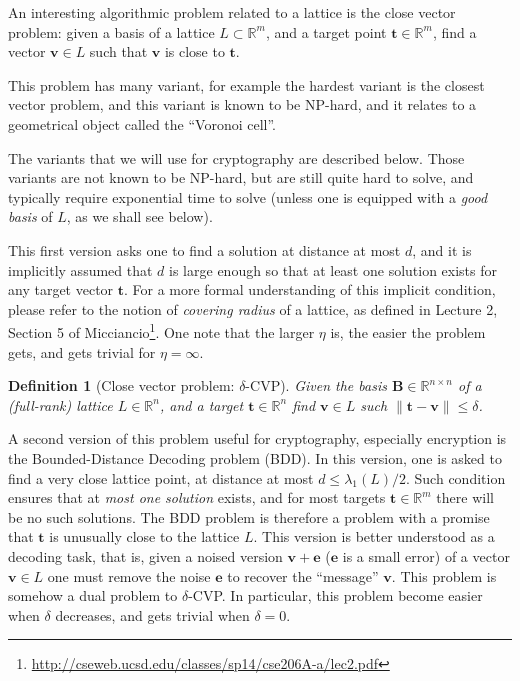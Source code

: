 \documentclass[12pt]{article}
\renewcommand{\vec}{\mathbf}
\newcommand{\R}{\mathbb R}
\newtheorem{definition}{Definition}{\bfseries}{\upshape}
\begin{document}
An interesting algorithmic problem related to a lattice is the close vector problem: given a basis of a lattice $L \subset \R^m$, and a target point $\vec t \in \R^m$, find a vector $\vec v \in L$ such that $\vec v$ is close to $\vec t$.

This problem has many variant, for example the hardest variant is the closest vector problem, and this variant is known to be NP-hard, and it relates to a geometrical object called the ``Voronoi cell''. 

The variants that we will use for cryptography are described below. Those variants are not known to be NP-hard, but are still quite hard to solve, and typically require exponential time to solve (unless one is equipped with a {\em good basis} of $L$, as we shall see below).

This first version asks one to find a solution at distance at most $d$, and it is implicitly assumed that $d$ is large enough so that at least one solution exists for any target vector $\vec t$. For a more formal understanding of this implicit condition, please refer to the notion of {\em covering radius} of a lattice, as defined in Lecture 2, Section 5 of Micciancio\footnote{\url{http://cseweb.ucsd.edu/classes/sp14/cse206A-a/lec2.pdf}}. One note that the larger $\eta$ is, the easier the problem gets, and gets trivial for $\eta = \infty$.

\begin{definition}[Close vector problem: $\delta$-CVP]
  Given the basis $\vec B \in \R^{n \times n}$ of a (full-rank) lattice $L \in \R^n$, and a target $\vec t \in \R^n$ find $\vec v \in L$ such $\|\vec t - \vec v\| \leq \delta$.
\end{definition}



A second version of this problem useful for cryptography, especially encryption is the Bounded-Distance Decoding problem (BDD). In this version, one is asked to find a very close lattice point, at distance at most $d \leq \lambda_1(L)/2$. Such condition ensures that at {\em most one solution} exists, and for most targets $\vec t \in \R^m$ there will be no such solutions. The BDD problem is therefore a problem with a promise that $\vec t$ is unusually close to the lattice $L$. This version is better understood as a decoding task, that is, given a noised version $\vec v + \vec e$ ($\vec e$ is a small error) of a vector $\vec v \in L$ one must remove the noise $\vec e$ to recover the ``message'' $\vec v$. This problem is somehow a dual problem to $\delta$-CVP. In particular, this problem become easier when $\delta$ decreases, and gets trivial when $\delta = 0$. 
\end{document}
